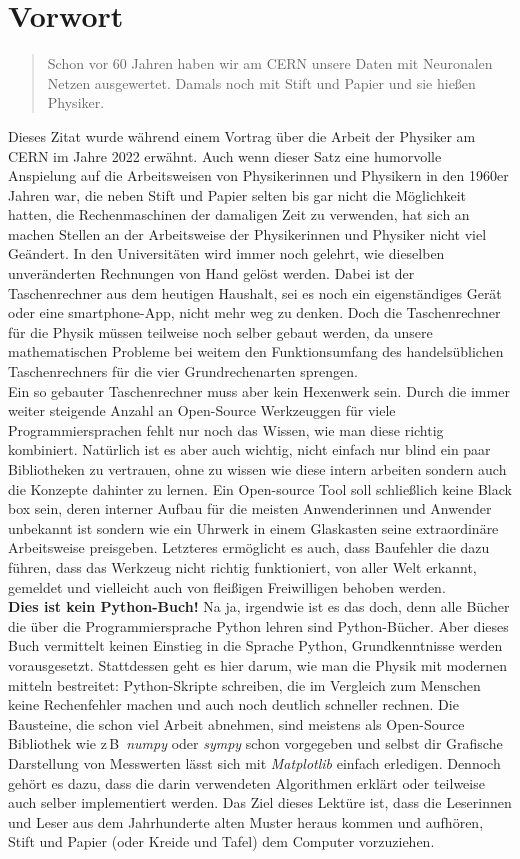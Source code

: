 \chapter{Vorwort}

\begin{quote}
	\glqq{}Schon vor 60 Jahren haben wir am CERN unsere Daten mit Neuronalen Netzen ausgewertet. Damals noch mit Stift und Papier und sie hießen Physiker.\grqq{}
\end{quote}

Dieses Zitat wurde während einem Vortrag über die Arbeit der Physiker am CERN im Jahre 2022 erwähnt. Auch wenn dieser Satz eine humorvolle Anspielung auf die Arbeitsweisen von Physikerinnen und Physikern in den 1960er Jahren war, die neben Stift und Papier selten bis gar nicht die Möglichkeit hatten, die Rechenmaschinen der damaligen Zeit zu verwenden, hat sich an machen Stellen an der Arbeitsweise der Physikerinnen und Physiker nicht viel Geändert. In den Universitäten wird immer noch gelehrt, wie dieselben unveränderten Rechnungen von Hand gelöst werden. Dabei ist der Taschenrechner aus dem heutigen Haushalt, sei es noch ein eigenständiges Gerät oder eine smartphone-App, nicht mehr weg zu denken. Doch die Taschenrechner für die Physik müssen teilweise noch selber gebaut werden, da unsere mathematischen Probleme bei weitem den Funktionsumfang des handelsüblichen Taschenrechners für die vier Grundrechenarten sprengen. \\
Ein so gebauter Taschenrechner muss aber kein Hexenwerk sein. Durch die immer weiter steigende Anzahl an Open-Source Werkzeuggen für viele Programmiersprachen fehlt nur noch das Wissen, wie man diese richtig kombiniert. Natürlich ist es aber auch wichtig, nicht einfach nur blind ein paar Bibliotheken zu vertrauen, ohne zu wissen wie diese intern arbeiten sondern auch die Konzepte dahinter zu lernen. Ein Open-source Tool soll schließlich keine Black box sein, deren interner Aufbau für die meisten Anwenderinnen und Anwender unbekannt ist sondern wie ein Uhrwerk in einem Glaskasten seine extraordinäre Arbeitsweise preisgeben. Letzteres ermöglicht es auch, dass Baufehler die dazu führen, dass das Werkzeug nicht richtig funktioniert, von aller Welt erkannt, gemeldet und vielleicht auch von fleißigen Freiwilligen behoben werden. \\
\textbf{Dies ist kein Python-Buch!} Na ja, irgendwie ist es das doch, denn alle Bücher die über die Programmiersprache Python lehren sind Python-Bücher. Aber dieses Buch vermittelt keinen Einstieg in die Sprache Python, Grundkenntnisse werden vorausgesetzt. Stattdessen geht es hier darum, wie man die Physik mit modernen mitteln bestreitet: Python-Skripte schreiben, die im Vergleich zum Menschen keine Rechenfehler machen und auch noch deutlich schneller rechnen. Die Bausteine, die schon viel Arbeit abnehmen, sind meistens als Open-Source Bibliothek wie z\,B\, \textit{numpy} oder \textit{sympy} schon vorgegeben und selbst dir Grafische Darstellung von Messwerten lässt sich mit \textit{Matplotlib} einfach erledigen. Dennoch gehört es dazu, dass die darin verwendeten Algorithmen erklärt oder teilweise auch selber implementiert werden.
Das Ziel dieses Lektüre ist, dass die Leserinnen und Leser aus dem Jahrhunderte alten Muster heraus kommen und aufhören, Stift und Papier (oder Kreide und Tafel) dem Computer vorzuziehen.
